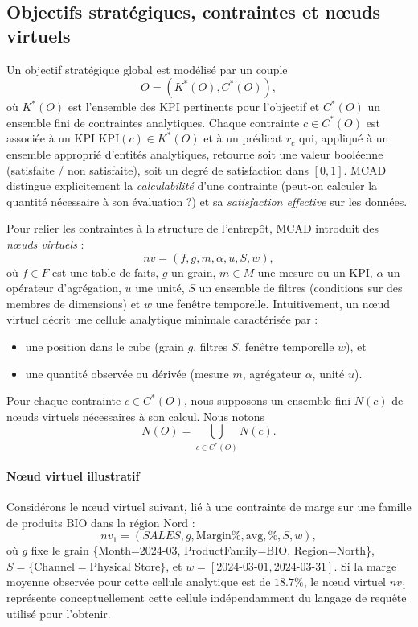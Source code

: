 \documentclass[journal]{IEEEtran}
\begin{document}
\subsection{Objectifs stratégiques, contraintes et nœuds virtuels}

Un objectif stratégique global est modélisé par un couple
\[
O=(K^*(O),C^*(O)),
\]
où $K^*(O)$ est l'ensemble des KPI pertinents pour l'objectif et $C^*(O)$ un ensemble fini de contraintes analytiques. Chaque contrainte $c\in C^*(O)$ est associée à un KPI $\mathrm{KPI}(c)\in K^*(O)$ et à un prédicat $r_c$ qui, appliqué à un ensemble approprié d'entités analytiques, retourne soit une valeur booléenne (satisfaite / non satisfaite), soit un degré de satisfaction dans $[0,1]$. MCAD distingue explicitement la \emph{calculabilité} d'une contrainte (peut-on calculer la quantité nécessaire à son évaluation ?) et sa \emph{satisfaction effective} sur les données.

Pour relier les contraintes à la structure de l'entrepôt, MCAD introduit des \emph{nœuds virtuels} :
\[
nv=(f,g,m,\alpha,u,S,w),
\]
où $f\in F$ est une table de faits, $g$ un grain, $m\in M$ une mesure ou un KPI, $\alpha$ un opérateur d'agrégation, $u$ une unité, $S$ un ensemble de filtres (conditions sur des membres de dimensions) et $w$ une fenêtre temporelle. Intuitivement, un nœud virtuel décrit une cellule analytique minimale caractérisée par :
\begin{itemize}
  \item une position dans le cube (grain $g$, filtres $S$, fenêtre temporelle $w$), et
  \item une quantité observée ou dérivée (mesure $m$, agrégateur $\alpha$, unité $u$).
\end{itemize}

Pour chaque contrainte $c\in C^*(O)$, nous supposons un ensemble fini $N(c)$ de nœuds virtuels nécessaires à son calcul. Nous notons
\[
N(O)=\bigcup_{c\in C^*(O)} N(c).
\]

\paragraph*{Nœud virtuel illustratif}
Considérons le nœud virtuel suivant, lié à une contrainte de marge sur une famille de produits BIO dans la région Nord :
\[
nv_1=(\textit{SALES},g,\mathrm{Margin\%},\mathrm{avg},\%,S,w),
\]
où $g$ fixe le grain \{Month=2024-03, ProductFamily=BIO, Region=North\}, $S=\{\text{Channel}=\text{Physical Store}\}$, et $w=[2024\text{-}03\text{-}01,2024\text{-}03\text{-}31]$. Si la marge moyenne observée pour cette cellule analytique est de $18.7\%$, le nœud virtuel $nv_1$ représente conceptuellement cette cellule indépendamment du langage de requête utilisé pour l'obtenir.
\end{document}
